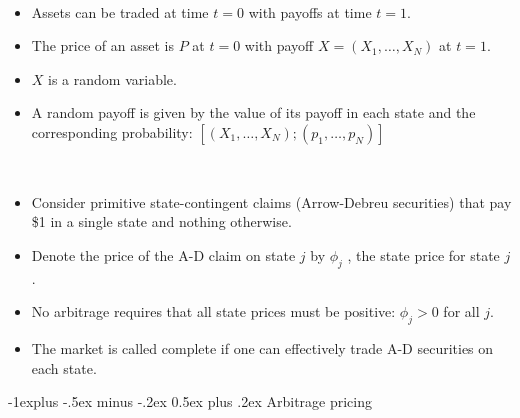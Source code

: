 \documentclass[10pt,landscape,a4paper]{article}
\makeatletter
\renewcommand{\subsection}{\@startsection{subsection}{2}{0mm}%
                                {-1explus -.5ex minus -.2ex}%
                                {0.5ex plus .2ex}%
                                {\normalfont\normalsize\bfseries}}
\makeatother
\begin{document}
\begin{multicols*}{3}
\begin{description}[itemsep=0pt]
	\item[State-space model] ~
	\begin{itemize}
		\item Assets can be traded at time $t = 0$ with payoffs at time $t = 1$.
		\item The price of an asset is $P$ at $t= 0$ with payoff $X=(X_1, \dots , X_N)$ at $t=1$.
		\item $X$ is a random variable.
		\item A random payoff is given by the value of	its payoff in each state and the corresponding probability:
		$[(X_1, \dots, X_N); (p_1, \dots , p_N)] $
	\end{itemize}
	\item[State Prices]~
	\begin{itemize}
		\item Consider primitive state-contingent claims (Arrow-Debreu securities) that pay \$1 in a	single state and nothing otherwise.
		\item Denote the price of the A-D claim on state $j$ by $\phi_j$ , the state price for state $j$.
		\item No arbitrage requires that all state prices must be positive: $\phi_j > 0$ for all $j$.
		\item The market is called complete if one can effectively trade A-D securities on each state.
	\end{itemize}	
\end{description}


\subsection{Arbitrage pricing}


\end{multicols*}
\end{document}
